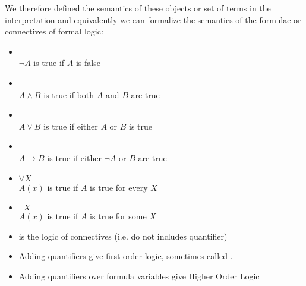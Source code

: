 We therefore defined the semantics of these objects or set of terms in the interpretation and equivalently we can formalize the semantics of the formulae or connectives of formal logic:
\begin{itemize}
\item {}\\
$\neg{A}$ is true if $A$ is false
\item {}\\
$A\land B$ is true if both $A$ and $B$ are true
\item {}\\
$A\lor B$ is true if either $A$ or $B$ is true
\item {}\\
$A\rightarrow B$ is true if either $\neg{A}$ or $B$ are true
\item {} $\forall X$\\
$A(x)$ is true if $A$ is true for every $X$
\item {} $\exists X$\\
$A(x)$ is true if $A$ is true for some $X$
\item {} is the logic of connectives (i.e. do not includes quantifier)
\item Adding quantifiers give first-order logic, sometimes called .
\item Adding quantifiers over formula variables give Higher Order Logic
\end{itemize}

